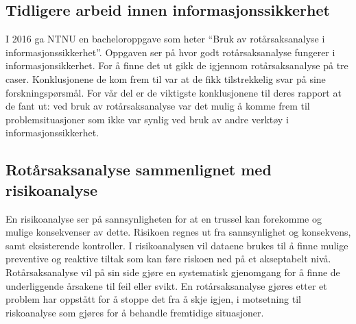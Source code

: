 \subsection{Tidligere arbeid innen informasjonssikkerhet}
I 2016 ga NTNU en bacheloroppgave som heter ``Bruk av rotårsaksanalyse i informasjonssikkerhet''\cite{RCARapport}. Oppgaven ser på hvor godt rotårsaksanalyse fungerer i informasjonsikkerhet. For å finne det ut gikk de igjennom rotårsaksanalyse på tre caser. Konklusjonene de kom frem til var at de fikk tilstrekkelig svar på sine forskningspørsmål. For vår del er de viktigste konklusjonene til deres rapport\cite{RCARapport} at de fant ut: ved bruk av rotårsaksanalyse var det mulig å komme frem til problemsituasjoner som ikke var synlig ved bruk av andre verktøy i informasjonssikkerhet.  

\subsection{Rotårsaksanalyse sammenlignet med risikoanalyse}
En risikoanalyse ser på sannsynligheten for at en trussel kan forekomme og mulige konsekvenser av dette. Risikoen regnes ut fra sannsynlighet og konsekvens, samt eksisterende kontroller. I risikoanalysen vil dataene brukes til å finne mulige preventive og reaktive tiltak som kan føre riskoen ned på et akseptabelt nivå. Rotårsaksanalyse vil på sin side gjøre en systematisk gjenomgang for å finne de underliggende årsakene til feil eller svikt. En rotårsaksanalyse gjøres etter et problem har oppstått for å stoppe det fra å skje igjen, i motsetning til riskoanalyse som gjøres for å behandle fremtidige situasjoner. 